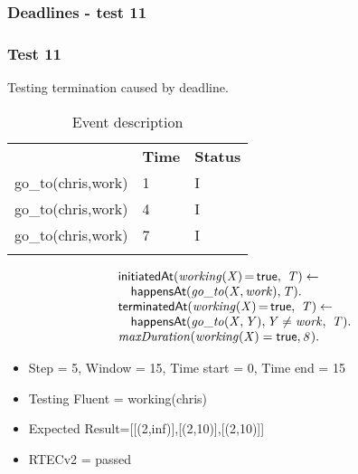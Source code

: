 \documentclass[8pt]{beamer}
\DeclareMathOperator{\val}{=}  %
\def \patsize {}
\def\happensAt{\textsf{\patsize happensAt}}
\def\initiatedAt{\textsf{\patsize initiatedAt}}
\def\terminatedAt{\textsf{\patsize terminatedAt}}
\def\true{\textsf{\patsize true}}
\newenvironment{mysplit}%
  {\arraycolsep 0pt \begin{array}{l}}%
  {\end{array}}
\begin{document}
\begin{frame}
    \frametitle{Deadlines - test 11}
    \subsubsection{Test 11}
    \small
    Testing termination caused by deadline.\linebreak
    \begin{minipage}{0.48\linewidth}
        \begin{table}[t!]
            \caption{Event description}
            \begin{center}

                \begin{tabular}{lll}
                    \hline\noalign{\smallskip}
                    \multicolumn{1}{l}{\textbf{Event}} & \multicolumn{1}{c}{\textbf{Time}} & \multicolumn{1}{c}{\textbf{Status}} \\
                    go\_to(chris,work)& 1 & I\\
                    go\_to(chris,work)& 4 & I\\
                    go\_to(chris,work)& 7 & I\\
                    \noalign{\smallskip}
                    \hline
                \end{tabular}
            \end{center}
        \end{table}
    \end{minipage}
    \begin{minipage}{0.48\linewidth}
        \begin{align*}
            \begin{mysplit}
                \initiatedAt\mathit{(working(X)\val\true,\ T)\leftarrow}\\
                \quad    \happensAt\mathit{(go\_to(X,work),T)}.\\
                \terminatedAt\mathit{(working(X)\val\true,\ T) \leftarrow}\\
                \quad    \happensAt\mathit{(go\_to(X,Y),Y\neq work,\ T)}.\\
                \mathit{maxDuration(working(X)=\true,8)}.\\
            \end{mysplit}
        \end{align*}
    \end{minipage}
    \begin{itemize}
        \item  Step = 5, Window = 15, Time start = 0, Time end = 15
        \item Testing Fluent = working(chris)
        \item Expected Result=[[(2,inf)],[(2,10)],[(2,10)]]
        \item RTECv2 = passed
    \end{itemize}
\end{frame}
\end{document}
